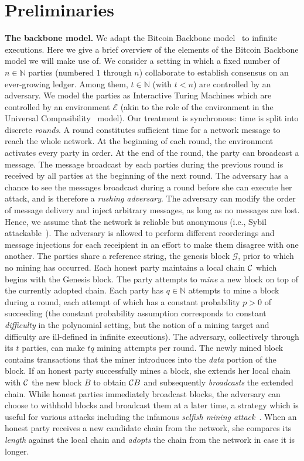 \section{Preliminaries}

\noindent
\textbf{The backbone model.}
We adapt the Bitcoin Backbone model~\cite{EC:GarKiaLeo15} to infinite executions. Here we give a brief
overview of the elements of the Bitcoin Backbone model we will make use of.
We consider a setting in which a fixed number of $n \in \mathbb{N}$ parties (numbered $1$ through $n$) collaborate to establish consensus on
an ever-growing ledger. Among them, $t \in \mathbb{N}$ (with $t < n$) are controlled by an adversary. We model
the parties as Interactive Turing Machines which are controlled by an
environment $\mathcal{E}$ (akin to the role of the environment in the Universal
Compasibility~\cite{EPRINT:Canetti07} model). Our treatment is synchronous: time
is split into discrete \emph{rounds}. A round constitutes sufficient time for a
network message to reach the whole network. At the beginning of each round, the
environment activates every party in order. At the end of the round, the party
can broadcast a message. The message broadcast by each parties during the
previous round is received by all parties at the beginning of the next round.
The adversary has a chance to see the messages broadcast during a round before
she can execute her attack, and is therefore a \emph{rushing adversary}. The
adversary can modify the order of message delivery and inject arbitrary
messages, as long as no messages are lost. Hence, we assume that the network is
reliable but anonymous (i.e., Sybil attackable~\cite{DBLP:conf/iptps/Douceur02}).
The adversary is allowed to perform different reorderings and message injections
for each receipient in an effort to make them disagree with one another.
The parties share a reference string, the genesis block $\mathcal{G}$, prior to
which no mining has occurred.
Each honest party maintains a local chain $\mathcal{C}$ which begins with the Genesis
block. The party attempts to \emph{mine} a new block on top of the currently
adopted chain. Each party has $q \in \mathbb{N}$ attempts to mine a block during
a round, each attempt of which has a constant probability $p > 0$ of succeeding
(the constant probability assumption corresponds to constant \emph{difficulty}
in the polynomial setting, but the notion of a mining target and difficulty are
ill-defined in infinite executions). The adversary, collectively through its $t$
parties, can make $tq$ mining attempts per round.
The newly mined block contains transactions that the miner introduces into the
\emph{data} portion of the block. If an honest party successfully mines a block,
she extends her local chain with $\mathcal{C}$ the new block $B$ to obtain $\mathcal{C} B$
and subsequently \emph{broadcasts} the extended chain. While honest parties
immediately broadcast blocks, the adversary can choose
to withhold blocks and broadcast them at a later time, a strategy which is
useful for various attacks including the infamous
\emph{selfish mining attack}~\cite{FC:EyaSir14}. When an honest party receives a
new candidate chain from the network, she compares its \emph{length} against the
local chain and \emph{adopts} the chain from the network in case it is longer.

